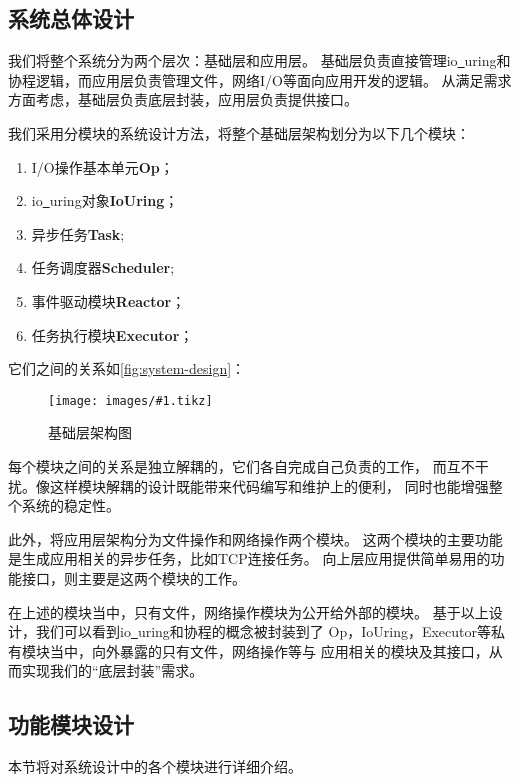 \documentclass[supercite]{HustGraduPaper}
\newcommand{\cfig}[3]{
  \begin{figure}[htb]
    \centering
    \texttt{[image: images/\#1.tikz]}
    \caption{#3}
    \label{fig:#1}
  \end{figure}
}
\newcommand{\rfig}[1]{\autoref{fig:#1}}
\theoremstyle{definition}
\begin{document}
\subsection{系统总体设计}

我们将整个系统分为两个层次：基础层和应用层。
基础层负责直接管理io\underline{~}uring和协程逻辑，而应用层负责管理文件，网络I/O等面向应用开发的逻辑。
从满足需求方面考虑，基础层负责底层封装，应用层负责提供接口。\par

我们采用分模块的系统设计方法，将整个基础层架构划分为以下几个模块：

\begin{enumerate}
  \item I/O操作基本单元\textbf{Op}；
  \item io\underline{~}uring对象\textbf{IoUring}；
  \item 异步任务\textbf{Task};
  \item 任务调度器\textbf{Scheduler};
  \item 事件驱动模块\textbf{Reactor}；
  \item 任务执行模块\textbf{Executor}；
\end{enumerate}

它们之间的关系如\rfig{system-design}：\par

\cfig{system-design}{0.9}{基础层架构图}

每个模块之间的关系是独立解耦的，它们各自完成自己负责的工作，
而互不干扰。像这样模块解耦的设计既能带来代码编写和维护上的便利，
同时也能增强整个系统的稳定性。\par

此外，将应用层架构分为文件操作和网络操作两个模块。
这两个模块的主要功能是生成应用相关的异步任务，比如TCP连接任务。
向上层应用提供简单易用的功能接口，则主要是这两个模块的工作。\par

在上述的模块当中，只有文件，网络操作模块为公开给外部的模块。
基于以上设计，我们可以看到io\underline{~}uring和协程的概念被封装到了
Op，IoUring，Executor等私有模块当中，向外暴露的只有文件，网络操作等与
应用相关的模块及其接口，从而实现我们的“底层封装”需求。\par

\subsection{功能模块设计}
本节将对系统设计中的各个模块进行详细介绍。\par
\end{document}
